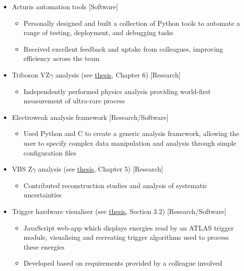 \documentclass[a4paper]{article}
\newcommand\bodysize{\fontsize{11}{13}}
\newcommand\link[2]{{\color{hl}\uline{\href{#1}{#2}}}}
\newcommand\cpp{{C\nolinebreak[4]\hspace{-.05em}\raisebox{.45ex}{\relsize{-3}\bf+\hspace{-.08em}+}}\xspace}
\newcommand\sidetitle[2][0em]{%
  \fontfamily{phv}\fontseries{b}\fontsize{12}{13}\selectfont\color{hl}
  \hspace{.1em}
  \rotatebox[origin=c]{90}{\hspace{#1}#2}
}
\newcommand\lefttitleblockvpad{\vspace{.3em}}
\newcommand\lefttitleblock[3]{%
  \colorbox{#1}{%
    \begin{minipage}[c]{.04\textwidth}
      \lefttitleblockvpad
      \sidetitle{#2}
      \lefttitleblockvpad
    \end{minipage}{\color{hl}\vrule width 1pt}%
    \begin{minipage}[c]{.005\textwidth}\hfill\end{minipage}
    \begin{minipage}[c]{.94\textwidth}
      \lefttitleblockvpad
      #3
      \lefttitleblockvpad
    \end{minipage}%
  }
}
\newcommand\thesislink[1]{https://raw.githubusercontent.com/hacooke/thesis/refs/heads/master/thesis.pdf\#page=#1}
\newcommand\seethesis[3][Chapter]{(see \link{\thesislink{#3}}{thesis}, #1 #2)}
\begin{document}
\lefttitleblock{bg1}{PROJECTS}{%
    \fontseries{m}\fontshape{n}\bodysize\selectfont%
    \begin{itemize}
      \setlength\itemsep{.2em}
      \item Acturis automation tools
        \hfill{\color{hl}[Software]}
      \begin{itemize}
        \item Personally designed and built a collection of Python tools to automate
          a range of testing, deployment, and debugging tasks
        \item Received excellent feedback and uptake from colleagues, improving
          efficiency across the team
      \end{itemize}
      \item Triboson VZ$\gamma$ analysis \seethesis{6}{150}
        \hfill{\color{hl}[Research]}
      \begin{itemize}
        \item Independently performed physics analysis providing world-first
          measurement of ultra-rare process
      \end{itemize}
      \item Electroweak analysis framework
        \hfill{\color{hl}[Research/Software]}
      \begin{itemize}
        \item Used Python and \cpp to create a generic analysis framework,
          allowing the user to specify complex data manipulation and analysis
          through simple configuration files
      \end{itemize}
      \item VBS Z$\gamma$ analysis \seethesis{5}{127}
        \hfill{\color{hl}[Research]}
      \begin{itemize}
        \item Contributed reconstruction studies and analysis of systematic
          uncertainties
      \end{itemize}
      \item Trigger hardware visualiser \seethesis[Section]{3.2}{68}
        \hfill{\color{hl}[Research/Software]}
      \begin{itemize}
        \item JavaScript web-app which displays energies read by an ATLAS
          trigger module, visualising and recreating trigger algorithms used
          to process these energies
        \item Developed based on requirements provided by a colleague involved

\end{itemize}
\end{itemize}}
\end{document}
